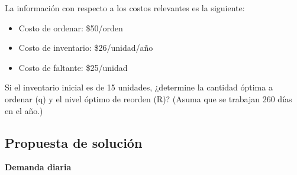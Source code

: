 La información con respecto a los costos relevantes es la siguiente:

\begin{itemize}
    \item Costo de ordenar: \$50/orden
    \item Costo de inventario: \$26/unidad/año
    \item Costo de faltante: \$25/unidad
\end{itemize}

Si el inventario inicial es de 15 unidades, ¿determine la cantidad óptima a ordenar (q) y el nivel óptimo de reorden (R)? (Asuma que se trabajan 260 días en el año.)

\subsection{Propuesta de solución}

\textbf{Demanda diaria}

